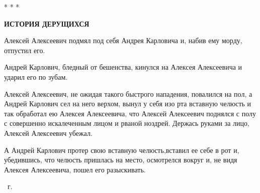 \begin{center}
    * * *
\end{center}

\begin{center}
    \textbf{ИСТОРИЯ ДЕРУЩИХСЯ}
\end{center}
    Алексей Алексеевич подмял под себя  
    Андрея Карловича и,  набив ему морду,  отпустил
его.

    Андрей Карлович, бледный  от  бешенства,
кинулся на Алексея  Алексеевича и ударил его
по зубам.

    Алексей Алексеевич, не ожидая такого 
    быстрого нападения, повалился на пол, а Андрей
Карлович сел на него верхом,  вынул  у  себя
изо рта вставную челюсть и так обработал  ею
Алексея Алексеевича, что Алексей  Алексеевич
поднялся  с полу с  совершенно  искалеченным
лицом и рваной ноздрей.  Держась  руками  за
лицо, Алексей Алексеевич убежал.

    А Андрей Карлович  протер свою  вставную
челюсть,вставил ее себе в рот и, убедившись,
что  челюсть  пришлась на место,  осмотрелся
вокруг и, не видя Алексея Алексеевича, пошел
его разыскивать.

{\raggedleft
	\parbox{6cm}{~г.
	}

}